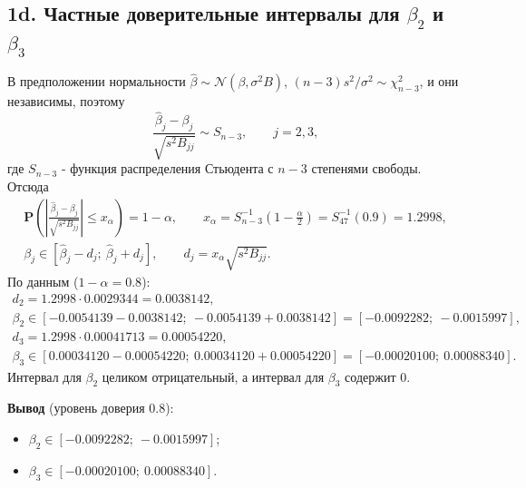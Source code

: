 \documentclass[12pt]{spbstu-task}
\renewcommand{\Prob}{\mathbf{P}}
\begin{document}
\subsection*{1d. Частные доверительные интервалы для \(\beta_2\) и \(\beta_3\)}
В предположении нормальности \(\hat{\beta} \sim \mathcal{N}\left(\beta, \sigma^2B\right)\),
\((n - 3)s^2/\sigma^2 \sim \chi^2_{n - 3}\), и они независимы, поэтому
\begin{displaymath}
  \frac{\hat{\beta}_j - \beta_j}{\sqrt{s^2B_{jj}}} \sim S_{n - 3},\qquad j = 2, 3,
\end{displaymath}
где \(S_{n - 3}\) - функция распределения Стьюдента с \(n - 3\) степенями свободы. Отсюда
\begin{gather*}
  \Prob\left(\left|\frac{\hat{\beta}_j - \beta_j}{\sqrt{s^2B_{jj}}}\right| \le x_\alpha\right) = 1 - \alpha,\qquad
  x_\alpha = S^{-1}_{n - 3}\left(1 - \frac{\alpha}{2}\right) = S^{-1}_{47}(0.9) = 1.2998,\\
  \beta_j \in \left[\hat{\beta}_j - d_j;\ \hat{\beta}_j + d_j\right],\qquad d_j = x_\alpha\sqrt{s^2B_{jj}}.
\end{gather*}
По данным (\(1 - \alpha = 0.8\)):
\begin{gather*}
  d_2 = 1.2998\cdot 0.0029344 = 0.0038142,\\
  \beta_2 \in [-0.0054139 - 0.0038142;\ -0.0054139 + 0.0038142] = [-0.0092282;\ -0.0015997],\\
  d_3 = 1.2998\cdot 0.00041713 = 0.00054220,\\
  \beta_3 \in [0.00034120 - 0.00054220;\ 0.00034120 + 0.00054220] = [-0.00020100;\ 0.00088340].
\end{gather*}
Интервал для \(\beta_2\) целиком отрицательный, а интервал для \(\beta_3\) содержит 0.

\noindent\textbf{Вывод} (уровень доверия 0.8):
\begin{itemize}[label=\textbullet]
  \item \(\beta_2 \in [-0.0092282;\ -0.0015997]\);
  \item \(\beta_3 \in [-0.00020100;\ 0.00088340]\).
\end{itemize}
\end{document}
